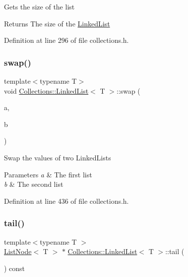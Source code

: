 Gets the size of the list \begin{DoxyReturn}{Returns}
The size of the \hyperlink{class_collections_1_1_linked_list}{Linked\+List} 
\end{DoxyReturn}


Definition at line 296 of file collections.\+h.

\hypertarget{class_collections_1_1_linked_list_af2bcf49a857d26c8a47aa42dedbc6b2a}{}\label{class_collections_1_1_linked_list_af2bcf49a857d26c8a47aa42dedbc6b2a} 
\subsubsection{\texorpdfstring{swap()}{swap()}}
{\footnotesize\ttfamily template$<$typename T$>$ \\
void \hyperlink{class_collections_1_1_linked_list}{Collections\+::\+Linked\+List}$<$ T $>$\+::swap (\begin{DoxyParamCaption}\item[{\hyperlink{class_collections_1_1_linked_list}{Linked\+List}$<$ T $>$ \&}]{a,  }\item[{\hyperlink{class_collections_1_1_linked_list}{Linked\+List}$<$ T $>$ \&}]{b }\end{DoxyParamCaption})\hspace{0.3cm}{\ttfamily [static]}}

Swap the values of two Linked\+Lists 
\begin{DoxyParams}{Parameters}
{\em a} & The first list \\
\hline
{\em b} & The second list \\
\hline
\end{DoxyParams}


Definition at line 436 of file collections.\+h.

\hypertarget{class_collections_1_1_linked_list_abb1529550a311ed2cfd784fc17540b8c}{}\label{class_collections_1_1_linked_list_abb1529550a311ed2cfd784fc17540b8c} 
\subsubsection{\texorpdfstring{tail()}{tail()}}
{\footnotesize\ttfamily template$<$typename T $>$ \\
\hyperlink{class_collections_1_1_list_node}{List\+Node}$<$ T $>$ $\ast$ \hyperlink{class_collections_1_1_linked_list}{Collections\+::\+Linked\+List}$<$ T $>$\+::tail (\begin{DoxyParamCaption}{ }\end{DoxyParamCaption}) const}

